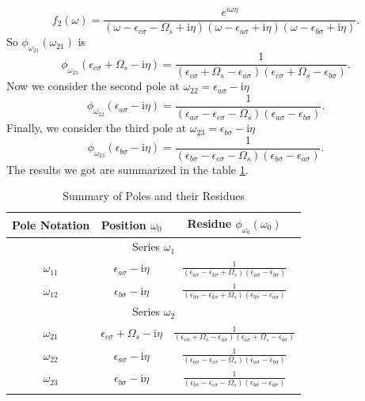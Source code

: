 \documentclass[12pt]{caltech_thesis}
\begin{document}
\begin{equation}
f_2(\omega) = \frac{e^{i\omega \eta }}{(\omega-\epsilon_{c \sigma}-\Omega_s+\mathrm{i} \eta)(\omega-\epsilon_{a \sigma}+\mathrm{i} \eta)(\omega-\epsilon_{b \sigma}+\mathrm{i} \eta)}.
\end{equation}
So $\phi_{\omega_{21}}(\omega _{21})$ is
\begin{equation}
\phi_{\omega_{21}}(\epsilon_{c \sigma} + \Omega_s - \mathrm{i} \eta) = \frac{1}{(\epsilon_{c \sigma} + \Omega_s -\epsilon_{a \sigma})(\epsilon_{c \sigma} + \Omega_s -\epsilon_{b \sigma})}.
\end{equation}
Now we consider the second pole at $\omega_{22} = \epsilon _{a\sigma } - \mathrm{i} \eta$
\begin{equation}
\phi_{\omega_{22}}(\epsilon_{a \sigma} - \mathrm{i} \eta) = \frac{1}{(\epsilon_{a \sigma} -\epsilon_{c \sigma}-\Omega_s)(\epsilon_{a \sigma} -\epsilon_{b \sigma})}.
\end{equation}
Finally, we consider the third pole at $\omega_{23} = \epsilon _{b\sigma } - \mathrm{i} \eta$
\begin{equation}
\phi_{\omega_{23}}(\epsilon_{b \sigma} - \mathrm{i} \eta) = \frac{1}{(\epsilon_{b \sigma} -\epsilon_{c \sigma}-\Omega_s)(\epsilon_{b \sigma} -\epsilon_{a \sigma})}.
\end{equation}
The results we got are summarized in the table \ref{tabpoles_residues_virtual}.\\
\begin{table}[h]
\centering
\caption{Summary of Poles and their Residues}
\begin{tabular}{|c|c|c|}
\hline
Pole Notation & Position $\omega_0$ & Residue $\phi_{\omega_0}(\omega_0)$ \\
\hline
\multicolumn{3}{|c|}{Series $\omega_1$} \\
\hline
$\omega_{11}$ & $\epsilon_{a \sigma} - \mathrm{i} \eta$ & $\frac{1}{(\epsilon_{a \sigma} -\epsilon_{k \sigma}+\Omega_s)(\epsilon_{a \sigma} -\epsilon_{b \sigma})}$ \\
$\omega_{12}$ & $\epsilon_{b \sigma} - \mathrm{i} \eta$ & $\frac{1}{(\epsilon_{b \sigma} -\epsilon_{k \sigma}+\Omega_s)(\epsilon_{b \sigma} -\epsilon_{a \sigma})}$ \\
\hline
\multicolumn{3}{|c|}{Series $\omega_2$} \\
\hline
$\omega_{21}$ & $\epsilon_{c \sigma} + \Omega_s - \mathrm{i} \eta$ & $\frac{1}{(\epsilon_{c \sigma} + \Omega_s -\epsilon_{a \sigma})(\epsilon_{c \sigma} + \Omega_s -\epsilon_{b \sigma})}$ \\
$\omega_{22}$ & $\epsilon_{a \sigma} - \mathrm{i} \eta$ & $\frac{1}{(\epsilon_{a \sigma} -\epsilon_{c \sigma}-\Omega_s)(\epsilon_{a \sigma} -\epsilon_{b \sigma})}$ \\
$\omega_{23}$ & $\epsilon_{b \sigma} - \mathrm{i} \eta$ & $\frac{1}{(\epsilon_{b \sigma} -\epsilon_{c \sigma}-\Omega_s)(\epsilon_{b \sigma} -\epsilon_{a \sigma})}$ \\
\hline
\label{tabpoles_residues_virtual}
\end{tabular}
\end{table}
\end{document}
